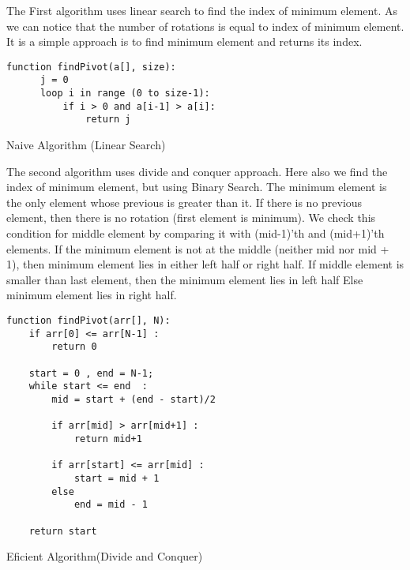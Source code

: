 \documentclass[conference]{IEEEtran}
\begin{document}
The First algorithm uses linear search to find the index of minimum element. As we can notice that the number of rotations is equal to index of minimum element. It is a simple approach is to find minimum element and returns its index.

\bigskip

\begin{algorithm}[H]
\begin{lstlisting}
function findPivot(a[], size):
      j = 0
      loop i in range (0 to size-1):
          if i > 0 and a[i-1] > a[i]:
              return j
\end{lstlisting}

 \caption{Naive Algorithm (Linear Search) }
\end{algorithm}

\bigskip
The second algorithm uses divide and conquer approach. Here also we find the index of minimum element, but using Binary Search.
\newline The minimum element is the only element whose previous is greater than it.
\newline If there is no previous element, then there is no rotation (first element is minimum).
\newline We check this condition for middle element by comparing it with (mid-1)’th and (mid+1)’th elements.
\newline If the minimum element is not at the middle (neither mid nor mid + 1), then minimum element lies in either left half or right half.
\newline If middle element is smaller than last element, then the minimum element lies in left half
\newline Else minimum element lies in right half.
\bigskip


\bigskip

\begin{algorithm}[H]
\begin{lstlisting}
function findPivot(arr[], N):
    if arr[0] <= arr[N-1] :
        return 0

    start = 0 , end = N-1;
    while start <= end  :
        mid = start + (end - start)/2

        if arr[mid] > arr[mid+1] :
            return mid+1

        if arr[start] <= arr[mid] :
            start = mid + 1
        else
            end = mid - 1

    return start
\end{lstlisting}

 \caption{Eficient Algorithm(Divide and Conquer)}
\end{algorithm}
\bigskip
\end{document}
